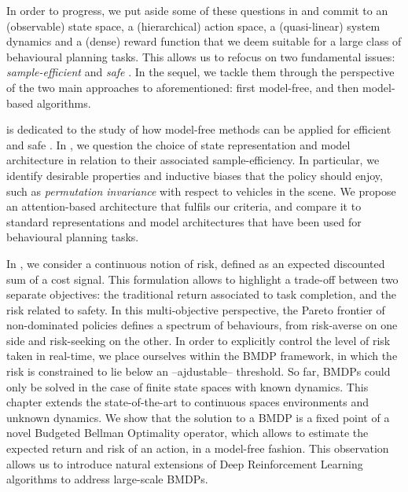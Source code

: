 In order to progress, we put aside some of these questions in \textbf{} and commit to an (observable) state space, a (hierarchical) action space, a (quasi-linear) system dynamics and a (dense) reward function that we deem suitable for a large class of behavioural planning tasks. This allows us to refocus on two fundamental issues: \textit{sample-efficient} and \textit{safe} . In the sequel, we tackle them through the perspective of the two main approaches to  aforementioned: first model-free, and then model-based algorithms.

\textbf{} is dedicated to the study of how model-free methods can be applied for efficient and safe . In \textbf{}, we question the choice of state representation and model architecture in relation to their associated sample-efficiency. In particular, we identify desirable properties and inductive biases that the policy should enjoy, such as \emph{permutation invariance} with respect to vehicles in the scene. We propose an attention-based architecture that fulfils our criteria, and compare it to standard representations and model architectures that have been used for behavioural planning tasks. 

In \textbf{}, we consider a continuous notion of risk, defined as an expected discounted sum of a cost signal. This formulation allows to highlight a trade-off between two separate objectives: the traditional return associated to task completion, and the risk related to safety. In this multi-objective perspective, the Pareto frontier of non-dominated policies defines a spectrum of behaviours, from risk-averse on one side and risk-seeking on the other. In order to explicitly control the level of risk taken in real-time, we place ourselves within the \gls{BMDP} framework, in which the risk is constrained to lie below an --ajdustable-- threshold. 
So far, \glspl{BMDP} could only be solved in the case of finite state spaces with known dynamics. This chapter extends the state-of-the-art to continuous spaces environments and unknown dynamics. We show that the solution to a \gls{BMDP} is a fixed point of a novel Budgeted Bellman Optimality operator, which allows to estimate the expected return and risk of an action, in a model-free fashion. This observation allows us to introduce natural extensions of Deep Reinforcement Learning algorithms to address large-scale \glspl{BMDP}.

